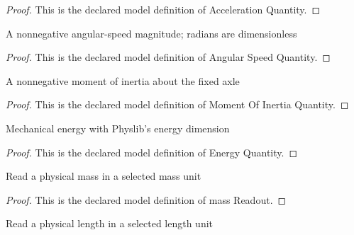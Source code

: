 \begin{proof}
  This is the declared model definition of Acceleration Quantity.
\end{proof}
\begin{definition}
  \label{def:physics:phyx-mini-0782:phyxminiproblems-problemphyxmini0782-angularspeedquantity}
  A nonnegative angular-speed magnitude; radians are dimensionless
\end{definition}
\begin{proof}
  This is the declared model definition of Angular Speed Quantity.
\end{proof}
\begin{definition}
  \label{def:physics:phyx-mini-0782:phyxminiproblems-problemphyxmini0782-momentofinertiaquantity}
  A nonnegative moment of inertia about the fixed axle
\end{definition}
\begin{proof}
  This is the declared model definition of Moment Of Inertia Quantity.
\end{proof}
\begin{definition}
  \label{def:physics:phyx-mini-0782:phyxminiproblems-problemphyxmini0782-energyquantity}
  Mechanical energy with Physlib's energy dimension
\end{definition}
\begin{proof}
  This is the declared model definition of Energy Quantity.
\end{proof}
\begin{definition}
  \label{def:physics:phyx-mini-0782:phyxminiproblems-problemphyxmini0782-massreadout}
  Read a physical mass in a selected mass unit
\end{definition}
\begin{proof}
  This is the declared model definition of mass Readout.
\end{proof}
\begin{definition}
  \label{def:physics:phyx-mini-0782:phyxminiproblems-problemphyxmini0782-lengthreadout}
  Read a physical length in a selected length unit
\end{definition}
